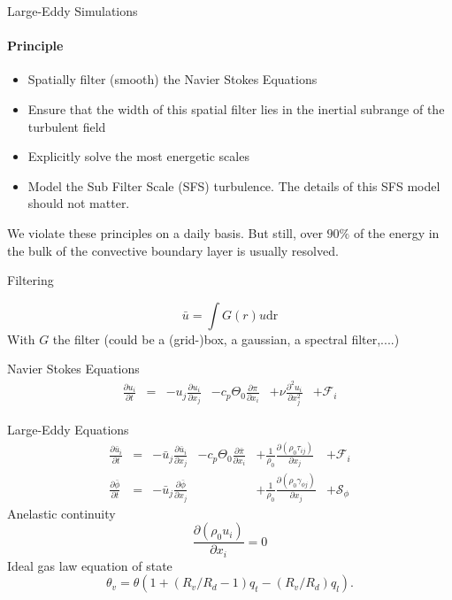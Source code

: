 \documentclass[handout]{beamer}
\newcommand{\source}[2]{\ensuremath{\mathcal{S}_{#1}^{\mathrm{#2}}}}
\newcommand{\force}[2]{\ensuremath{\mathcal{F}_{#1}^{\mathrm{#2}}}}
\begin{document}
\begin{frame}[<+->]{Large-Eddy Simulations}
\framesubtitle{Principle}
 \begin{itemize}
  \item Spatially filter (smooth) the Navier Stokes Equations
  \item Ensure that the width of this spatial filter lies in the inertial subrange of the turbulent field
  \item Explicitly solve the most energetic scales
  \item Model the Sub Filter Scale (SFS) turbulence. The details of this SFS model should not matter. 
 \end{itemize}
We violate these principles on a daily basis. But still, over $90\%$ of the energy in the bulk of the convective boundary layer is usually resolved.

\end{frame}

\begin{frame}{Filtering}

\[
 \bar{u} = \int G(r) u \mathrm{dr}
\]
 With $G$ the filter (could be a (grid-)box, a gaussian, a spectral filter,....)
\end{frame}

\begin{frame}{Navier Stokes Equations}
 \begin{align*}
\frac{\partial {u}_i}{\partial t} & = 
&{- {u}_j \frac{\partial {u}_i}{\partial x_j} }
&{- c_p \Theta_0 \frac{\partial{\pi}}{\partial x_i}}
&{+ \nu \frac{\partial^2 u_i} {\partial x^2_j}}
&{ + \force{i}{} }
\end{align*}

\end{frame}

\begin{frame}{Large-Eddy Equations}
 \begin{align*}
\frac{\partial \bar{u}_i}{\partial t} & = 
&{- \bar{u}_j \frac{\partial \bar{u}_i}{\partial x_j} }
&{- c_p \Theta_0 \frac{\partial\bar{\pi}}{\partial x_i}}
&{+ \frac{1}{\rho_0} \frac{\partial (\rho_0 \tau_{ij})} {\partial x_j}}
&{ + \force{i}{} }
\\
\frac{\partial \bar{\phi}}{\partial t} & = 
&{ - \bar{u}_j \frac{\partial  \bar{\phi}}{\partial x_j}} 
&&{+ \frac{1}{\rho_0} \frac{\partial (\rho_0  \gamma_{\phi j})} {\partial x_j}}
&{+\source{\phi}{}}
\end{align*}
{
Anelastic continuity $$
 \frac{\partial (\rho_0 u_i) }{\partial x_i} = 0 \label{eq:continuity}
$$
}
{
Ideal gas law equation of state $$\theta_v = \theta\left(1 + (R_v/R_d-1)q_t - (R_v/R_d)q_l\right).$$
}

\end{frame}
\end{document}
